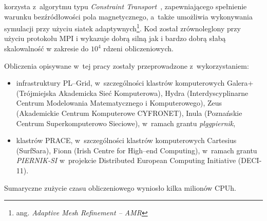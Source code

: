 korzysta z~algorytmu typu \emph{Constraint Transport}~\cite{EH88}, zapewniającego
spełnienie warunku bezźródłowości pola magnetycznego, a~także umożliwia
wykonywania symulacji przy użyciu siatek adaptywnych\footnote{ang.
\emph{Adaptive Mesh Refinement -- AMR}}. Kod został zrównoleglony przy użyciu
protokołu MPI i wykazuje dobrą silną jak i bardzo dobrą słabą skalowalność w
zakresie do $10^4$ rdzeni obliczeniowych.
%
\par Obliczenia opisywane w~tej pracy zostały przeprowadzone z~wykorzystaniem:
%
\begin{itemize}
   \item infrastruktury PL--Grid, w~szczególności klastrów
      komputerowych Galera+ (Trójmiejska Akademicka Sieć Komputerowa), Hydra
      (Interdyscyplinarne Centrum Modelowania Matematycznego i Komputerowego),
      Zeus (Akademickie Centrum Komputerowe CYFRONET), Inula (Poznańskie Centrum
      Superkomputerowo Sieciowe), w~ramach grantu \emph{plggpiernik},
   \item klastrów PRACE, w~szczególności klastrów komputerowych
      Cartesius (SurfSara), Fionn (Irish Centre for High--end Computing),
      w~ramach grantu \emph{PIERNIK-SI} w~projekcie Distributed European
      Computing Initiative (DECI-11).
\end{itemize}
Sumaryczne zużycie czasu obliczeniowego wyniosło kilka milionów CPUh.
%

